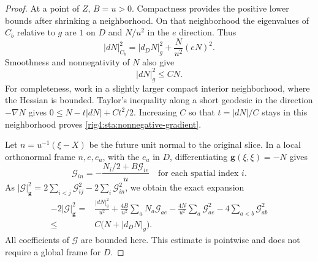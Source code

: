 \begin{proof}
At a point of $Z$, $B=u>0$. Compactness provides the positive lower
bounds after shrinking a neighborhood. On that neighborhood the
eigenvalues of $C_b$ relative to $g$ are $1$ on $D$ and $N/u^2$ in the
$e$ direction. Thus
\begin{equation}\label{rig4:sta:degenerate-norm}
 |dN|_{C_b}^2=|d_DN|_g^2+\frac N{u^2}(eN)^2.
\end{equation}
Smoothness and nonnegativity of $N$ also give
\begin{equation}\label{rig4:sta:nonnegative-gradient}
 |dN|_g^2\le C N.
\end{equation}
For completeness, work in a slightly larger compact interior
neighborhood, where the Hessian is bounded. Taylor's inequality along
a short geodesic in the direction $-\nabla N$ gives
$0\le N-t|dN|+Ct^2/2$. Increasing $C$ so that $t=|dN|/C$ stays
in this neighborhood proves \eqref{rig4:sta:nonnegative-gradient}.

Let $n=u^{-1}(\xi-X)$ be the future unit normal to the original
slice. In a local orthonormal frame $n,e,e_a$, with the $e_a$ in $D$,
differentiating $\mathbf g(\xi,\xi)=-N$ gives
\[
 \mathcal G_{in}=-\frac{N_i/2+B\mathcal G_{ie}}u
 \quad\text{for each spatial index }i.
\]
As
$|\mathcal G|_{\mathbf g}^2
 =2\sum_{i<j}\mathcal G_{ij}^2-2\sum_i\mathcal G_{in}^2$,
we obtain the exact expansion
\begin{equation}\label{rig4:sta:killing-norm-bound}
 \begin{split}
 -2|\mathcal G|_{\mathbf g}^2
   ={}&\frac{|dN|_g^2}{u^2}
       +\frac{4B}{u^2}\sum_aN_a\mathcal G_{ae}
       -\frac{4N}{u^2}\sum_a\mathcal G_{ae}^2
       -4\sum_{a<b}\mathcal G_{ab}^2\\
   \le{}& C\bigl(N+|d_DN|_g\bigr).
 \end{split}
\end{equation}
All coefficients of $\mathcal G$ are bounded here. This estimate is
pointwise and does not require a global frame for $D$.


\end{proof}
